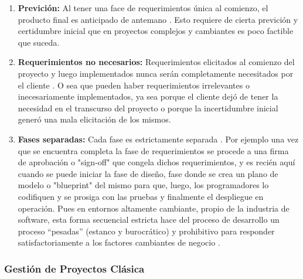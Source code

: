 \begin{enumerate}

\item \textbf{Previción:} Al tener una face de requerimientos única al comienzo, el producto final es anticipado de antemano \cite{Scrum-Institute-2015}. Esto requiere de cierta previción y certidumbre inicial que en proyectos complejos y cambiantes es poco factible que suceda.

\item \textbf{Requerimientos no necesarios:} Requerimientos elicitados al comienzo del proyecto y luego implementados nunca serán completamente necesitados por el cliente \cite{Scrum-Institute-2015}. O sea que pueden haber requerimientos irrelevantes o inecesariamente implementados, ya sea porque el cliente dejó de tener la necesidad en el transcurso del proyecto o porque la incertidumbre inicial generó una mala elicitación de los mismos.

\item \textbf{Fases separadas:} Cada fase es estrictamente separada \cite{Scrum-Institute-2015}. Por ejemplo una vez que se encuentra completa la fase de requerimientos se procede a una firma de aprobación o "sign-off" que congela dichos requerimientos, y es recién aquí cuando se puede iniciar la fase de diseño, fase donde se crea un plano de modelo o "blueprint" del mismo para que, luego, los programadores lo codifiquen y se prosiga con las pruebas y finalmente el despliegue en operación. Pues en entornos altamente cambiante, propio de la industria de software, esta forma secuencial estricta hace del proceso de desarrollo un proceso “pesadas” (estanco y burocrático) y prohibitivo para responder satisfactoriamente a los factores cambiantes de negocio \cite{Martin-Alaimo-2014}.

\end{enumerate}

\subsubsection{Gestión de Proyectos Clásica}

